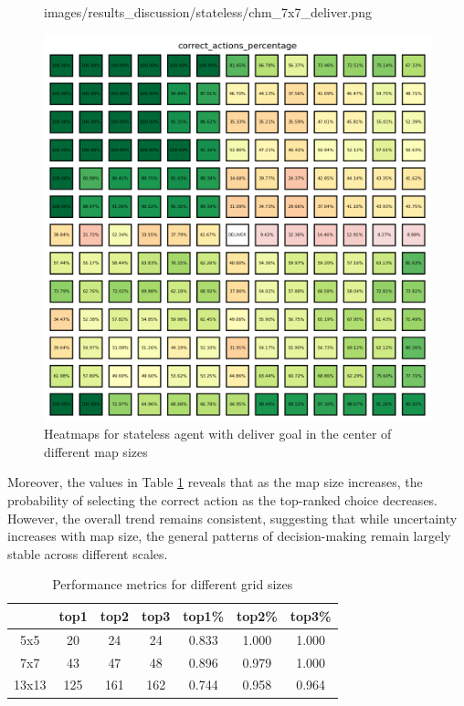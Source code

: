 \begin{figure}[h!]
\begin{minipage}[b]{0.32\textwidth}
{      images/results_discussion/stateless/chm_7x7_deliver.png
    }
    \caption{7x7}
    \label{fig:chm_7x7_deliver}
  \end{minipage}
  \hfill
  \begin{minipage}[b]{0.32\textwidth}
    \centering
    \includegraphics[width=\textwidth]{
      images/results_discussion/stateless/chm_13x13_deliver.png
    }
    \caption{13x13}
    \label{fig:chm_13x13_deliver}
  \end{minipage}
  \caption{Heatmaps for stateless agent with deliver goal in the center of
  different map sizes}
  \label{fig:stateless_deliver_correctness}
\end{figure}
\vspace{5mm}

Moreover, the values in Table \ref{tab:performance} reveals that as the map size
increases, the probability of selecting the correct action as the top-ranked
choice decreases. However, the overall trend remains consistent, suggesting that
while uncertainty increases with map size, the general patterns of decision-making
remain largely stable across different scales.

\vspace{5mm}
\begin{table}[h!]
  \centering
  \begin{tabular}{c|ccc|ccc}
          & top1 & top2 & top3 & top1\% & top2\% & top3\% \\
    \hline
    5x5   & 20   & 24   & 24   & 0.833  & 1.000  & 1.000  \\
    7x7   & 43   & 47   & 48   & 0.896  & 0.979  & 1.000  \\
    13x13 & 125  & 161  & 162  & 0.744  & 0.958  & 0.964  \\
  \end{tabular}
  \caption{Performance metrics for different grid sizes}
  \label{tab:performance}
\end{table}
\vspace{5mm}

